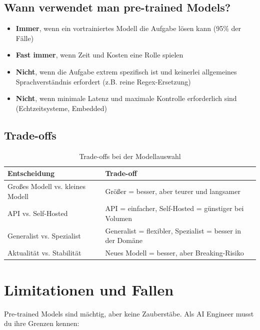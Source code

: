\subsection{Wann verwendet man pre-trained Models?}

\begin{itemize}[leftmargin=*]
    \item \textbf{Immer}, wenn ein vortrainiertes Modell die Aufgabe lösen kann (95\% der Fälle)
    \item \textbf{Fast immer}, wenn Zeit und Kosten eine Rolle spielen
    \item \textbf{Nicht}, wenn die Aufgabe extrem spezifisch ist und keinerlei allgemeines Sprachverständnis erfordert (z.B. reine Regex-Ersetzung)
    \item \textbf{Nicht}, wenn minimale Latenz und maximale Kontrolle erforderlich sind (Echtzeitsysteme, Embedded)
\end{itemize}

\subsection{Trade-offs}

\begin{table}[H]
\centering
\begin{tabularx}{\linewidth}{lX}
\toprule
\textbf{Entscheidung} & \textbf{Trade-off} \\
\midrule
Großes Modell vs. kleines Modell & Größer = besser, aber teurer und langsamer \\
API vs. Self-Hosted & API = einfacher, Self-Hosted = günstiger bei Volumen \\
Generalist vs. Spezialist & Generalist = flexibler, Spezialist = besser in der Domäne \\
Aktualität vs. Stabilität & Neues Modell = besser, aber Breaking-Risiko \\
\bottomrule
\end{tabularx}
\caption{Trade-offs bei der Modellauswahl}
\label{tab:model-tradeoffs}
\end{table}

\section{Limitationen und Fallen}

Pre-trained Models sind mächtig, aber keine Zauberstäbe. Als AI Engineer musst du ihre Grenzen kennen:

